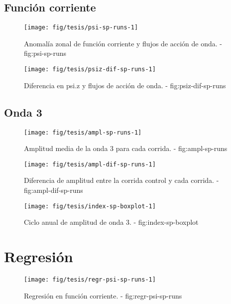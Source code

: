 \documentclass[spanish,a4paper]{book}
\begin{document}
\subsection{Función corriente}\label{funcion-corriente-3}

\begin{landscape}\begin{figure}

{\centering \texttt{[image: fig/tesis/psi-sp-runs-1]} 

}

\caption{Anomalía zonal de función corriente y flujos de acción de onda. - fig:psi-sp-runs}\label{fig:psi-sp-runs}
\end{figure}
\end{landscape}

\begin{figure*}
\texttt{[image: fig/tesis/psiz-dif-sp-runs-1]} \caption{Diferencia en psi.z y flujos de acción de onda. - fig:psiz-dif-sp-runs}\label{fig:psiz-dif-sp-runs}
\end{figure*}

\subsection{Onda 3}\label{onda-3-2}

\begin{figure*}
\texttt{[image: fig/tesis/ampl-sp-runs-1]} \caption{Amplitud media de la onda 3 para cada corrida. - fig:ampl-sp-runs}\label{fig:ampl-sp-runs}
\end{figure*}

\begin{figure*}
\texttt{[image: fig/tesis/ampl-dif-sp-runs-1]} \caption{Diferencia de amplitud entre la corrida control y cada corrida. - fig:ampl-dif-sp-runs}\label{fig:ampl-dif-sp-runs}
\end{figure*}

\begin{figure*}
\texttt{[image: fig/tesis/index-sp-boxplot-1]} \caption{Ciclo anual de amplitud de onda 3. - fig:index-sp-boxplot}\label{fig:index-sp-boxplot}
\end{figure*}

\section{Regresión}\label{regresion}

\begin{figure*}
\texttt{[image: fig/tesis/regr-psi-sp-runs-1]} \caption{Regresión en función corriente. - fig:regr-psi-sp-runs}\label{fig:regr-psi-sp-runs}
\end{figure*}
\end{document}
